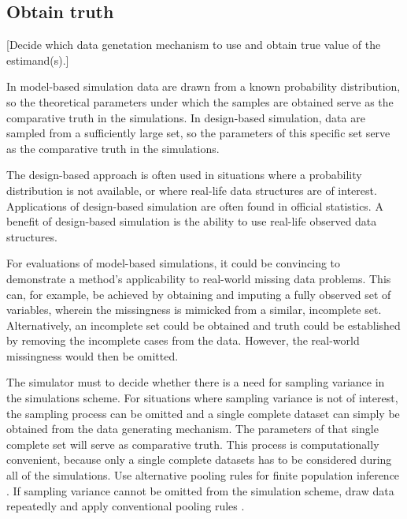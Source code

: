 \documentclass[bimj,fleqn]{w-art}
\theoremstyle{plain}
\theoremstyle{definition}
\begin{document}
\subsection{Obtain truth}


[Decide which data genetation mechanism to use and obtain true value of the estimand(s).] 

In model-based simulation data are drawn from a known probability distribution, so the theoretical parameters under which the samples are obtained serve as the comparative truth in the simulations. In design-based simulation, data are sampled from a sufficiently large set, so the parameters of this specific set serve as the comparative truth in the simulations. 

The design-based approach is often used in situations where a probability distribution is not available, or where real-life data structures are of interest. Applications of design-based simulation are often found in official statistics. A benefit of design-based simulation is the ability to use real-life observed data structures.

For evaluations of model-based simulations, it could be convincing to demonstrate a method's applicability to real-world missing data problems. This can, for example, be achieved by obtaining and imputing a fully observed set of variables, wherein the missingness is mimicked from a similar, incomplete set. Alternatively, an incomplete set could be obtained and truth could be established by removing the incomplete cases from the data. However, the real-world missingness would then be omitted.

The simulator must to decide whether there is a need for sampling variance in the simulations scheme. For situations where sampling variance is not of interest, the sampling process can be omitted and a single complete dataset can simply be obtained from the data generating mechanism. The parameters of that single complete set will serve as comparative truth. This process is computationally convenient, because only a single complete datasets has to be considered during all of the simulations. Use alternative pooling rules for finite population inference \citep{raghunathan2003multiple,vink14}. If sampling variance cannot be omitted from the simulation scheme, draw data repeatedly and apply conventional pooling rules \citep[cf.][p. 76-77]{rubi87}.
\end{document}
